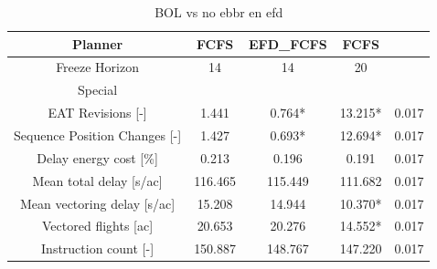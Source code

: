\begin{table}[htbp]
\caption{BOL vs no ebbr en efd}
\begin{center}
\footnotesize
\setlength{\tabcolsep}{3pt}
\renewcommand{\arraystretch}{1.000}
\begin{tabular}{|c|c|c|c|c|}
\hline
Planner & FCFS & EFD\_FCFS & FCFS &  \\
\hline
Freeze Horizon & 14 & 14 & 20 &  \\
\hline
Special &  &  &  &  \\
\hline
EAT Revisions [-] & 1.441 & 0.764* & 13.215* & 0.017 \\
\hline
Sequence Position Changes [-] & 1.427 & 0.693* & 12.694* & 0.017 \\
\hline
Delay energy cost [\%] & 0.213 & 0.196 & 0.191 & 0.017 \\
\hline
Mean total delay [s/ac] & 116.465 & 115.449 & 111.682 & 0.017 \\
\hline
Mean vectoring delay [s/ac] & 15.208 & 14.944 & 10.370* & 0.017 \\
\hline
Vectored flights [ac] & 20.653 & 20.276 & 14.552* & 0.017 \\
\hline
Instruction count [-] & 150.887 & 148.767 & 147.220 & 0.017 \\
\hline
\end{tabular}
\label{tab:bol\_vs\_no\_ebbr\_en\_efd}
\end{center}
\end{table}